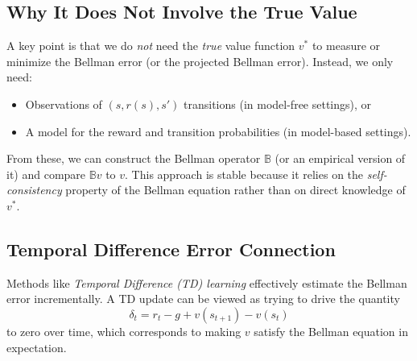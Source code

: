\subsection{Why It Does Not Involve the True Value}
A key point is that we do \emph{not} need the \emph{true} value function $v^*$ to measure or minimize the Bellman error (or the projected Bellman error). Instead, we only need:
\begin{itemize}
    \item Observations of $(s, r(s), s')$ transitions (in model-free settings), or
    \item A model for the reward and transition probabilities (in model-based settings).
\end{itemize}
From these, we can construct the Bellman operator $\mathbb{B}$ (or an empirical version of it) and compare $\mathbb{B}v$ to $v$. This approach is stable because it relies on the \emph{self-consistency} property of the Bellman equation rather than on direct knowledge of $v^*$.

\subsection{Temporal Difference Error Connection}
Methods like \emph{Temporal Difference (TD) learning} effectively estimate the Bellman error incrementally. A TD update can be viewed as trying to drive the quantity
\[
\delta_t 
= r_t - g + v(s_{t+1}) - v(s_t)
\]
to zero over time, which corresponds to making $v$ satisfy the Bellman equation in expectation.


